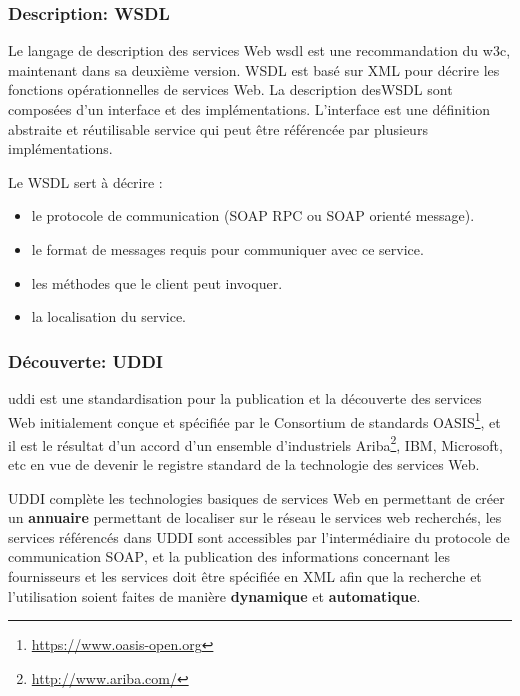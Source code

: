     \subsubsection{Description: WSDL} %
    \label{sec:wsdl}
    Le langage de description des services Web \acrshort{wsdl}
    \cite{chinnici2007web} est une recommandation du \acrshort{w3c},
    maintenant dans sa deuxième version.  \textsc{WSDL} est basé sur
    \textsc{XML} pour décrire les fonctions opérationnelles de
    services Web. La description des\textsc{WSDL} sont composées d'un
    interface et des implémentations. L'interface est une définition
    abstraite et réutilisable service qui peut être référencée par
    plusieurs implémentations.

    Le WSDL sert à décrire :
    \SpecialItem
    \begin{itemize} %
      \item le protocole de communication (SOAP RPC ou SOAP orienté
        message).

      \item le format de messages requis pour communiquer avec ce
        service.

      \item les méthodes que le client peut invoquer.

      \item la localisation du service.
   \end{itemize}
   \subsubsection{Découverte: UDDI}
   \label{sec:uddi}
   \acrshort{uddi} \cite{clement2004uddi} est une standardisation pour
   la publication et la découverte des services Web initialement
   conçue et spécifiée par le Consortium de standards
   OASIS\footnote{\url{https://www.oasis-open.org}}, et il est le
   résultat d'un accord d'un ensemble d’industriels
   Ariba\footnote{\url{http://www.ariba.com/}}, IBM, Microsoft, etc en
   vue de devenir le registre standard de la technologie des services
   Web.

   \textsc{UDDI} complète les technologies basiques de services Web en
   permettant de créer un \textbf{annuaire} permettant de localiser
   sur le réseau le services web recherchés, les services référencés
   dans \textsc{UDDI} sont accessibles par l'intermédiaire du
   protocole de communication \textsc{SOAP}, et la publication des
   informations concernant les fournisseurs et les services doit être
   spécifiée en \textsc{XML} afin que la recherche et l'utilisation
   soient faites de manière \textbf{dynamique} et
   \textbf{automatique}.

